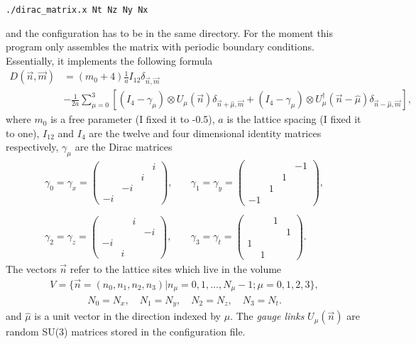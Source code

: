 \documentclass[a4paper,12pt]{scrartcl}
\begin{document}
\begin{center}
 \texttt{./dirac\_matrix.x Nt Nz Ny Nx}
\end{center}and the configuration has to be in the same directory. For the moment this program only assembles the matrix with periodic boundary conditions. Essentially, it implements the following formula \begin{align*}
    D(\vec{n},\vec{m})&=\left(m_0+4 \right)\frac{1}{a}I_{12}\delta_{\vec{n},\vec{m}}  \\
    &- \frac{1}{2a} \sum_{\mu=0}^3 \left[ (I_4-\gamma_\mu)\otimes U_\mu(\vec{n}) \delta_{\vec{n}+\hat{\mu}, \vec{m}}+ (I_4-\gamma_\mu)\otimes U_\mu^\dagger(\vec{n}-\hat{\mu})\delta_{\vec{n}-\hat{\mu},\vec{m}}\right],
\end{align*}where $m_0$ is a free parameter (I fixed it to -0.5), $a$ is the lattice spacing (I fixed it to one), $I_{12}$ and $I_4$ are the twelve and four dimensional identity matrices respectively, $\gamma_\mu$ are the Dirac matrices \begin{align*}
        \gamma_0 =\gamma_x= \begin{pmatrix}
          & & & i \\
          & & i & \\
          & -i & & \\
          -i & & &
        \end{pmatrix}, &\quad \gamma_1 = \gamma_y = \begin{pmatrix}
          & &  & -1 \\
          & & 1 &  \\
           & 1 & & \\
          -1 &  & &
        \end{pmatrix},\\ \\
        \gamma_2 = \gamma_z = \begin{pmatrix}
          & & i &  \\
          & &  & -i \\
          -i &  & & \\
           & i & &
        \end{pmatrix},&\quad \gamma_3 = \gamma_t = \begin{pmatrix}
          & & 1 &  \\
          & &  & 1 \\
          1 &  & & \\
           & 1 & &
        \end{pmatrix}.
    \end{align*}The vectors $\vec{n}$ refer to the lattice sites which live in the volume \begin{align*} V=\lbrace \vec{n}=(n_0,n_1,n_2,n_3)| n_\mu=0,1,\dots,N_\mu-1; \mu=0,1,2,3 \rbrace, \end{align*}\begin{align*}  N_0 = N_x, \quad N_1=N_y, \quad N_2=N_z, \quad N_3=N_t.\end{align*}and $\hat{\mu}$ is a unit vector in the direction indexed by $\mu$. The \textit{gauge links} $U_\mu(\vec{n})$ are random SU(3) matrices stored in the configuration file.
\end{document}
